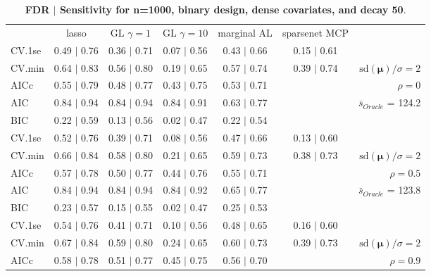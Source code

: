 \clearpage
\begin{table}\vspace{-.5cm}
\caption[l]{ {\it }
{ \bf FDR $\boldsymbol{\mid}$ Sensitivity for n=1000, binary design, dense covariates, and  decay  50}.}
\vspace{-.5cm}
\footnotesize{}
\begin{center}
\begin{tabular}{l*{5}{c}|r}
 & lasso & GL $\gamma=1$ & GL $\gamma=10$ & marginal AL & sparsenet MCP  & \\
 \cline{1-7}
CV.1se & 0.49 $\mid$ 0.76 & 0.36 $\mid$ 0.71 & 0.07 $\mid$ 0.56 & 0.43 $\mid$ 0.66 & 0.15 $\mid$ 0.61 & \\
CV.min & 0.64 $\mid$ 0.83 & 0.56 $\mid$ 0.80 & 0.19 $\mid$ 0.65 & 0.57 $\mid$ 0.74 & 0.39 $\mid$ 0.74 &  $\mathrm{sd}(\mathbf{\mu})/\sigma=2$ \\
AICc & 0.55 $\mid$ 0.79 & 0.48 $\mid$ 0.77 & 0.43 $\mid$ 0.75 & 0.53 $\mid$ 0.71 & & $\rho=0$ \\
AIC & 0.84 $\mid$ 0.94 & 0.84 $\mid$ 0.94 & 0.84 $\mid$ 0.91 & 0.63 $\mid$ 0.77 & &  \multirow{2}{*}{$\bar{s}_{Oracle}$ = 124.2} \\
BIC & 0.22 $\mid$ 0.59 & 0.13 $\mid$ 0.56 & 0.02 $\mid$ 0.47 & 0.22 $\mid$ 0.54 & &  \\
 \hline 
CV.1se & 0.52 $\mid$ 0.76 & 0.39 $\mid$ 0.71 & 0.08 $\mid$ 0.56 & 0.47 $\mid$ 0.66 & 0.13 $\mid$ 0.60 & \\
CV.min & 0.66 $\mid$ 0.84 & 0.58 $\mid$ 0.80 & 0.21 $\mid$ 0.65 & 0.59 $\mid$ 0.73 & 0.38 $\mid$ 0.73 &  $\mathrm{sd}(\mathbf{\mu})/\sigma=2$ \\
AICc & 0.57 $\mid$ 0.78 & 0.50 $\mid$ 0.77 & 0.44 $\mid$ 0.76 & 0.55 $\mid$ 0.71 & & $\rho=0.5$ \\
AIC & 0.84 $\mid$ 0.94 & 0.84 $\mid$ 0.94 & 0.84 $\mid$ 0.92 & 0.65 $\mid$ 0.77 & &  \multirow{2}{*}{$\bar{s}_{Oracle}$ = 123.8} \\
BIC & 0.23 $\mid$ 0.57 & 0.15 $\mid$ 0.55 & 0.02 $\mid$ 0.47 & 0.25 $\mid$ 0.53 & &  \\
 \hline 
CV.1se & 0.54 $\mid$ 0.76 & 0.41 $\mid$ 0.71 & 0.10 $\mid$ 0.56 & 0.48 $\mid$ 0.65 & 0.16 $\mid$ 0.60 & \\
CV.min & 0.67 $\mid$ 0.84 & 0.59 $\mid$ 0.80 & 0.24 $\mid$ 0.65 & 0.60 $\mid$ 0.73 & 0.39 $\mid$ 0.73 &  $\mathrm{sd}(\mathbf{\mu})/\sigma=2$ \\
AICc & 0.58 $\mid$ 0.78 & 0.51 $\mid$ 0.77 & 0.45 $\mid$ 0.75 & 0.56 $\mid$ 0.70 & & $\rho=0.9$ \\

\end{tabular}
\end{center}
\end{table}
